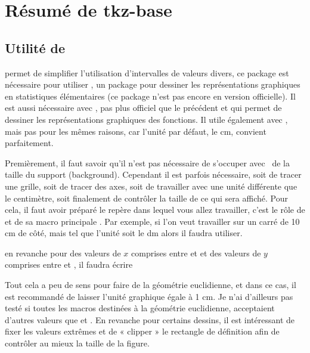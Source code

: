 
\section{Résumé de tkz-base}


\subsection{Utilité de }
 permet de simplifier l'utilisation d'intervalles de valeurs divers, ce package est nécessaire pour utiliser , un package pour dessiner les représentations graphiques en statistiques élémentaires (ce package n'est pas encore en version officielle). Il est aussi nécessaire  avec , pas plus officiel que le précédent et qui permet de dessiner les représentations graphiques des fonctions. Il utile également avec , mais pas pour les mêmes raisons, car l'unité par défaut, le cm, convient parfaitement.

Premièrement, il faut savoir qu'il n'est pas nécessaire de s'occuper avec \TIKZ\ de la taille du support (background). Cependant il est parfois nécessaire, soit de tracer une grille, soit de tracer des axes, soit de travailler avec une unité différente que le centimètre, soit finalement de contrôler la taille de ce qui sera affiché.
 Pour cela, il faut avoir préparé le repère dans lequel vous allez travailler, c'est le rôle de  et de sa macro principale  . Par exemple, si l'on veut travailler sur un carré de 10 cm de côté, mais  tel que l'unité soit le dm alors il faudra utiliser.


 en revanche pour des valeurs de $x$ comprises entre  et  et des valeurs de $y$ comprises entre  et , il faudra écrire
 

Tout cela a peu de sens pour faire de la géométrie euclidienne, et dans ce cas, il est recommandé de laisser l'unité graphique égale à 1 cm. Je n'ai d'ailleurs pas testé si toutes les macros  destinées à la géométrie euclidienne, acceptaient d'autres valeurs que  et . En revanche pour certains dessins, il est intéressant de fixer les valeurs extrêmes et de « clipper » le rectangle de définition afin de contrôler au mieux la taille de la figure.


